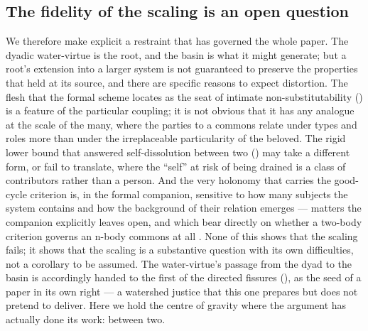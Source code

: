 \subsection{The fidelity of the scaling is an open question}
\label{p20:sub:watershed-open}

We therefore make explicit a restraint that has governed the whole paper. The dyadic water-virtue is the root, and the basin is what it might generate; but a root's extension into a larger system is not guaranteed to preserve the properties that held at its source, and there are specific reasons to expect distortion. The flesh that the formal scheme locates as the seat of intimate non-substitutability () is a feature of the particular coupling; it is not obvious that it has any analogue at the scale of the many, where the parties to a commons relate under types and roles more than under the irreplaceable particularity of the beloved. The rigid lower bound that answered self-dissolution between two () may take a different form, or fail to translate, where the ``self'' at risk of being drained is a class of contributors rather than a person. And the very holonomy that carries the good-cycle criterion is, in the formal companion, sensitive to how many subjects the system contains and how the background of their relation emerges --- matters the companion explicitly leaves open, and which bear directly on whether a two-body criterion governs an n-body commons at all \parencite{wan2026braid}. None of this shows that the scaling fails; it shows that the scaling is a substantive question with its own difficulties, not a corollary to be assumed. The water-virtue's passage from the dyad to the basin is accordingly handed to the first of the directed fissures (), as the seed of a paper in its own right --- a watershed justice that this one prepares but does not pretend to deliver. Here we hold the centre of gravity where the argument has actually done its work: between two.
